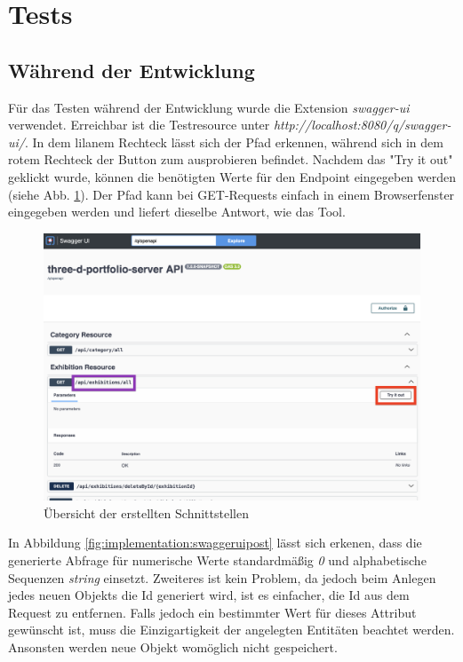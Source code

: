 \section{Tests}

\subsection{Während der Entwicklung}
\label{chapter:implementation:tests}
Für das Testen während der Entwicklung wurde die Extension \emph{swagger-ui} verwendet. 
Erreichbar ist die Testresource unter \emph{http://localhost:8080/q/swagger-ui/}. 
In dem lilanem Rechteck lässt sich der Pfad erkennen, während sich in dem rotem Rechteck der Button zum ausprobieren befindet. 
Nachdem das "Try it out" geklickt wurde, können die benötigten Werte für den Endpoint eingegeben werden (siehe Abb. \ref{fig:implementation:swaggerui}). 
Der Pfad kann bei GET-Requests einfach in einem Browserfenster eingegeben werden und liefert dieselbe Antwort, wie das Tool. 

\begin{figure}
    \centering
    \includegraphics[scale=0.3]{pics/swaggerui.png}
    \caption{Übersicht der erstellten Schnittstellen}
    \label{fig:implementation:swaggerui}
\end{figure}

In Abbildung \ref{fig:implementation:swaggeruipost} lässt sich erkenen, dass die generierte Abfrage für numerische Werte standardmäßig \emph{0} und alphabetische Sequenzen \emph{string} einsetzt. 
Zweiteres ist kein Problem, da jedoch beim Anlegen jedes neuen Objekts die Id generiert wird, ist es einfacher, die Id aus dem Request zu entfernen. 
Falls jedoch ein bestimmter Wert für dieses Attribut gewünscht ist, muss die Einzigartigkeit der angelegten Entitäten beachtet werden. 
Ansonsten werden neue Objekt womöglich nicht gespeichert.

